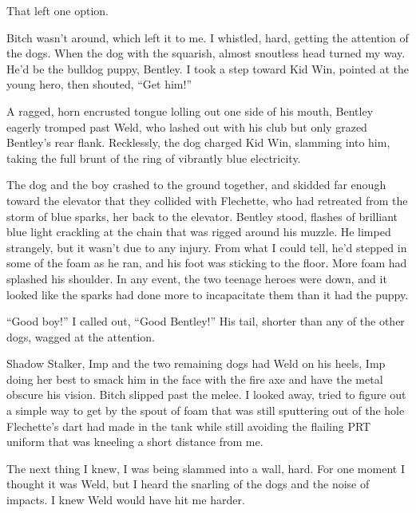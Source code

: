 That left one option.



Bitch wasn't around, which left it to me.  I whistled, hard, getting the attention of the dogs.  When the dog with the squarish, almost snoutless head turned my way.  He'd be the bulldog puppy, Bentley.  I took a step toward Kid Win, pointed at the young hero, then shouted, ``Get him!''



A ragged, horn encrusted tongue lolling out one side of his mouth, Bentley eagerly tromped past Weld, who lashed out with his club but only grazed Bentley's rear flank.  Recklessly, the dog charged Kid Win, slamming into him, taking the full brunt of the ring of vibrantly blue electricity.



The dog and the boy crashed to the ground together, and skidded far enough toward the elevator that they collided with Flechette, who had retreated from the storm of blue sparks, her back to the elevator.    Bentley stood, flashes of brilliant blue light crackling at the chain that was rigged around his muzzle.  He limped strangely, but it wasn't due to any injury.  From what I could tell, he'd stepped in some of the foam as he ran, and his foot was sticking to the floor.  More foam had splashed his shoulder.  In any event, the two teenage heroes were down, and it looked like the sparks had done more to incapacitate them than it had the puppy.



``Good boy!'' I called out, ``Good Bentley!''  His tail, shorter than any of the other dogs, wagged at the attention.



Shadow Stalker, Imp and the two remaining dogs had Weld on his heels, Imp doing her best to smack him in the face with the fire axe and have the metal obscure his vision.  Bitch slipped past the melee.  I looked away, tried to figure out a simple way to get by the spout of foam that was still sputtering out of the hole Flechette's dart had made in the tank while still avoiding the flailing PRT uniform that was kneeling a short distance from me.



The next thing I knew, I was being slammed into a wall, hard.  For one moment I thought it was Weld, but I heard the snarling of the dogs and the noise of impacts.  I knew Weld would have hit me harder.



